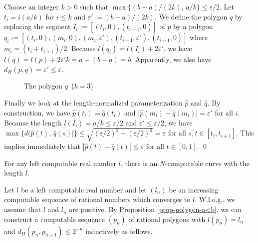 \documentclass{LMCS}
\theoremstyle{plain}
\begin{document}
Choose an integer $k>0$ such that $\max\{(b-a)/(2k),\, a/k\}  \le \varepsilon/2$. Let  $t_i= i(a/k)$ for $i\le k$ and $\varepsilon':= (b-a)/(2k)$. We define the polygon $q$ by replacing the segment $I_i:=[(t_i,0), (t_{i+1}, 0)]$ of $p$ by a polygon $q_i :=[(t_i, 0),(m_i, 0),(m_i, \varepsilon'),(t_{i+1}, \varepsilon'),(t_{i+1}, 0)]$ where $m_i=(t_i+t_{i+1})/2$. Because $l(q_i) = l(I_i) + 2\varepsilon'$, we have $l(q) = l(p) + 2\varepsilon' k = a+ (b-a)= b$. Apparently, we also have $d_H(p,q) = \varepsilon' \le \varepsilon$.

\begin{figure}[h]
\begin{center}
\end{center}
\caption{The polygon $q$\ ($k=3$)}\label{fig-q}
\end{figure}

\noindent Finally we look at the length-normalized parameterization $\hat{p}$ and $\hat{q}$. By construction, we have $\hat{p}(t_i) = \hat{q}(t_i)$ and $|\hat{p}(m_i)-\hat{q}(m_i)| = \varepsilon'$ for all $i$. Because the length $l(I_i) = a/k \le \varepsilon/2$ and $\varepsilon' \le \varepsilon/2$, we have $\max\{d(\hat{p}(t),\, \hat{q}(s)|\} \le \sqrt{(\varepsilon/2)^2+ (\varepsilon/2)^2}=\varepsilon$ for all $s,t \in [t_i, t_{i+1}]$. This implies immediately that $|\hat{p}(t) -\hat{q}(t)| \le \varepsilon$ for all $t\in[0,1]$.
\qed

\begin{thm}\label{thm-N-noncomp-length}
For any left computable real number $l$, there is an $N$-computable curve with the length $l$.
\end{thm}
\proof Let $l$ be a left computable real number and let $(l_n)$ be an increasing computable sequence of rational numbers which converges to $l$. W.l.o.g., we assume that $l$ and $l_n$ are positive. By Proposition \ref{prop-polygon-a<b}, we can construct a computable sequence $(p_n)$ of rational polygons with $l(p_n)=l_n$ and  $d_H(p_n, p_{n+1}) \le 2^{-n}$ inductively as follows.
\end{document}
